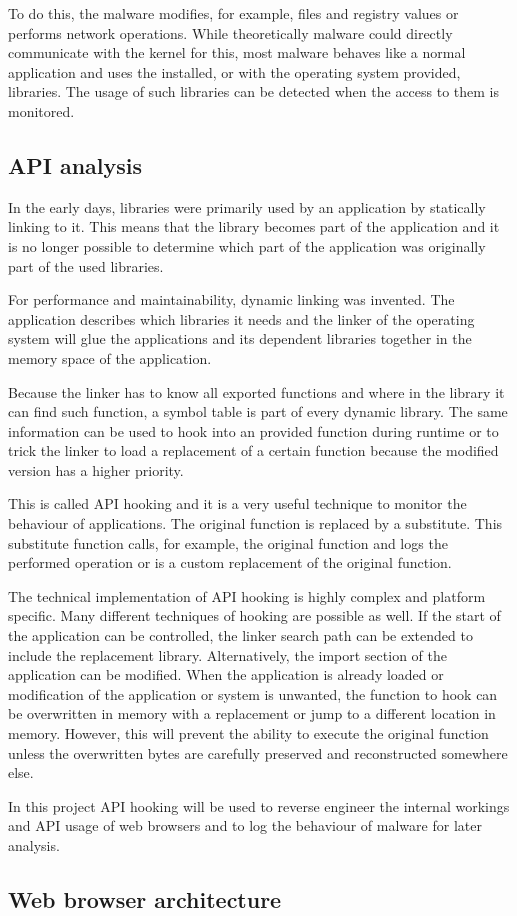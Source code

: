 To do this, the malware modifies, for example, files and registry values or performs network operations. While theoretically malware could directly communicate with the kernel for this, most malware behaves like a normal application and uses the installed, or with the operating system provided, libraries. The usage of such libraries can be detected when the access to them is monitored.

\subsection{API analysis}

In the early days, libraries were primarily used by an application by statically linking to it. This means that the library becomes part of the application and it is no longer possible to determine which part of the application was originally part of the used libraries.

For performance and maintainability, dynamic linking was invented. The application describes which libraries it needs and the linker of the operating system will glue the applications and its dependent libraries together in the memory space of the application. 

Because the linker has to know all exported functions and where in the library it can find such function, a symbol table is part of every dynamic library. The same information can be used to hook into an provided function during runtime or to trick the linker to load a replacement of a certain function because the modified version has a higher priority.

This is called API hooking\cite{} and it is a very useful technique to monitor the behaviour of applications. The original function is replaced by a substitute. This substitute function calls, for example, the original function and logs the performed operation or  is a custom replacement of the original function.

The technical implementation of API hooking is highly complex and platform specific. Many different techniques\cite{jbremer2012} of hooking are possible as well. If the start of the application can be controlled, the linker search path can be extended to include the replacement library. Alternatively, the import section of the application can be modified. When the application is already loaded or modification of the application or system is unwanted, the function to hook can be overwritten in memory with a replacement or jump to a different location in memory. However, this will prevent the ability to execute the original function unless the overwritten bytes are carefully preserved and reconstructed somewhere else.

In this project API hooking will be used to reverse engineer the internal workings and API usage of web browsers and to log the behaviour of malware for later analysis.

\subsection{Web browser architecture}


